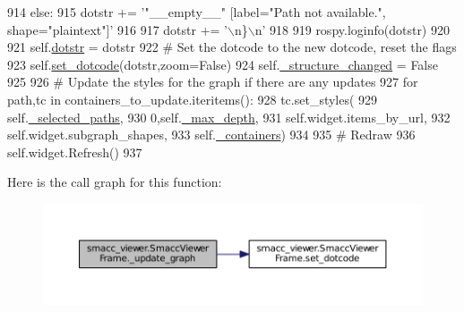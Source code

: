 \begin{DoxyCode}
914                     \textcolor{keywordflow}{else}:
915                         dotstr += \textcolor{stringliteral}{'"\_\_empty\_\_" [label="Path not available.", shape="plaintext"]'}
916 
917                     dotstr += \textcolor{stringliteral}{'\(\backslash\)n\}\(\backslash\)n'}
918 
919                     rospy.loginfo(dotstr)
920                     
921                     self.\hyperlink{classsmacc__viewer_1_1SmaccViewerFrame_af4c9a551ac2933b05aaae2adcbb26d63}{dotstr} = dotstr
922                     \textcolor{comment}{# Set the dotcode to the new dotcode, reset the flags}
923                     self.\hyperlink{classsmacc__viewer_1_1SmaccViewerFrame_ad10d7cac9a3e4c49d23ed1bc8f661b5f}{set\_dotcode}(dotstr,zoom=\textcolor{keyword}{False})
924                     self.\hyperlink{classsmacc__viewer_1_1SmaccViewerFrame_aa5d9c77b0c46dfb7d5258d1efbcc74b0}{\_structure\_changed} = \textcolor{keyword}{False}
925 
926                 \textcolor{comment}{# Update the styles for the graph if there are any updates}
927                 \textcolor{keywordflow}{for} path,tc \textcolor{keywordflow}{in} containers\_to\_update.iteritems():
928                     tc.set\_styles(
929                             self.\hyperlink{classsmacc__viewer_1_1SmaccViewerFrame_abf24da63695ba6bd9aae3dff6e3c5aa7}{\_selected\_paths},
930                             0,self.\hyperlink{classsmacc__viewer_1_1SmaccViewerFrame_acf8a98a2a2d4ae1f21e0fc3cd020b89a}{\_max\_depth},
931                             self.widget.items\_by\_url,
932                             self.widget.subgraph\_shapes,
933                             self.\hyperlink{classsmacc__viewer_1_1SmaccViewerFrame_a00ea07c6cc068340230dcac273ad5e90}{\_containers})
934 
935                 \textcolor{comment}{# Redraw}
936                 self.widget.Refresh()
937 
\end{DoxyCode}


Here is the call graph for this function\+:
\nopagebreak
\begin{figure}[H]
\begin{center}
\leavevmode
\includegraphics[width=350pt]{classsmacc__viewer_1_1SmaccViewerFrame_a35f35c81cd523594a190625c64baabb6_cgraph}
\end{center}
\end{figure}


